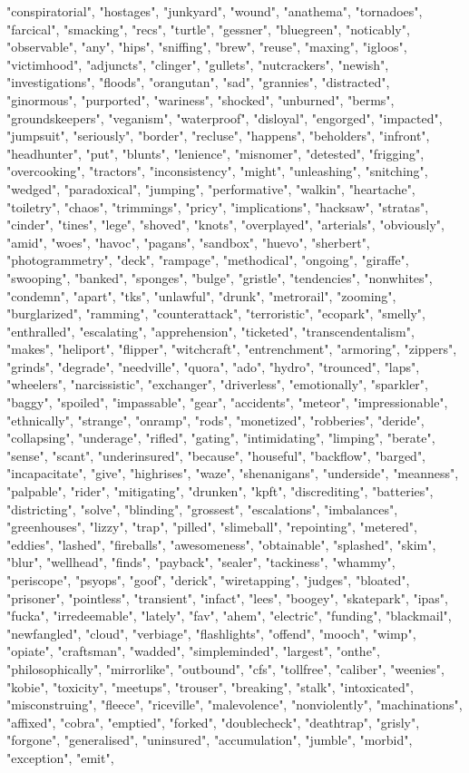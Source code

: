 "conspiratorial", "hostages", "junkyard", "wound", "anathema", "tornadoes", "farcical", "smacking", "recs", "turtle", "gessner", "bluegreen", "noticably", "observable", "any", "hips", "sniffing", "brew", "reuse", "maxing", "igloos", "victimhood", "adjuncts", "clinger", "gullets", "nutcrackers", "newish", "investigations", "floods", "orangutan", "sad", "grannies", "distracted", "ginormous", "purported", "wariness", "shocked", "unburned", "berms", "groundskeepers", "veganism", "waterproof", "disloyal", "engorged", "impacted", "jumpsuit", "seriously", "border", "recluse", "happens", "beholders", "infront", "headhunter", "put", "blunts", "lenience", "misnomer", "detested", "frigging", "overcooking", "tractors", "inconsistency", "might", "unleashing", "snitching", "wedged", "paradoxical", "jumping", "performative", "walkin", "heartache", "toiletry", "chaos", "trimmings", "pricy", "implications", "hacksaw", "stratas", "cinder", "tines", "lege", "shoved", "knots", "overplayed", "arterials", "obviously", "amid", "woes", "havoc", "pagans", "sandbox", "huevo", "sherbert", "photogrammetry", "deck", "rampage", "methodical", "ongoing", "giraffe", "swooping", "banked", "sponges", "bulge", "gristle", "tendencies", "nonwhites", "condemn", "apart", "tks", "unlawful", "drunk", "metrorail", "zooming", "burglarized", "ramming", "counterattack", "terroristic", "ecopark", "smelly", "enthralled", "escalating", "apprehension", "ticketed", "transcendentalism", "makes", "heliport", "flipper", "witchcraft", "entrenchment", "armoring", "zippers", "grinds", "degrade", "needville", "quora", "ado", "hydro", "trounced", "laps", "wheelers", "narcissistic", "exchanger", "driverless", "emotionally", "sparkler", "baggy", "spoiled", "impassable", "gear", "accidents", "meteor", "impressionable", "ethnically", "strange", "onramp", "rods", "monetized", "robberies", "deride", "collapsing", "underage", "rifled", "gating", "intimidating", "limping", "berate", "sense", "scant", "underinsured", "because", "houseful", "backflow", "barged", "incapacitate", "give", "highrises", "waze", "shenanigans", "underside", "meanness", "palpable", "rider", "mitigating", "drunken", "kpft", "discrediting", "batteries", "districting", "solve", "blinding", "grossest", "escalations", "imbalances", "greenhouses", "lizzy", "trap", "pilled", "slimeball", "repointing", "metered", "eddies", "lashed", "fireballs", "awesomeness", "obtainable", "splashed", "skim", "blur", "wellhead", "finds", "payback", "sealer", "tackiness", "whammy", "periscope", "psyops", "goof", "derick", "wiretapping", "judges", "bloated", "prisoner", "pointless", "transient", "infact", "lees", "boogey", "skatepark", "ipas", "fucka", "irredeemable", "lately", "fav", "ahem", "electric", "funding", "blackmail", "newfangled", "cloud", "verbiage", "flashlights", "offend", "mooch", "wimp", "opiate", "craftsman", "wadded", "simpleminded", "largest", "onthe", "philosophically", "mirrorlike", "outbound", "cfs", "tollfree", "caliber", "weenies", "kobie", "toxicity", "meetups", "trouser", "breaking", "stalk", "intoxicated", "misconstruing", "fleece", "riceville", "malevolence", "nonviolently", "machinations", "affixed", "cobra", "emptied", "forked", "doublecheck", "deathtrap", "grisly", "forgone", "generalised", "uninsured", "accumulation", "jumble", "morbid", "exception", "emit", 